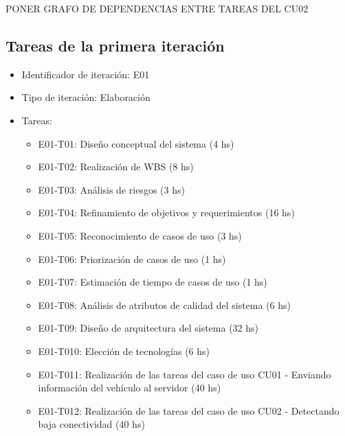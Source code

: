 PONER GRAFO DE DEPENDENCIAS ENTRE TAREAS DEL CU02


\subsection{Tareas de la primera iteración}

\begin{itemize}
\item Identificador de iteración: E01
\item Tipo de iteración: Elaboración
\item Tareas:
\begin{itemize}
\item E01-T01: Diseño conceptual del sistema (4 hs)
\item E01-T02: Realización de WBS (8 hs)
\item E01-T03: Análisis de riesgos (3 hs)
\item E01-T04: Refinamiento de objetivos y requerimientos (16 hs)
\item E01-T05: Reconocimiento de casos de uso (3 hs)
\item E01-T06: Priorización de casos de uso (1 hs)
\item E01-T07: Estimación de tiempo de casos de uso (1 hs)
\item E01-T08: Análisis de atributos de calidad del sistema (6 hs)
\item E01-T09: Diseño de arquitectura del sistema (32 hs)
\item E01-T010: Elección de tecnologías (6 hs)
\item E01-T011: Realización de las tareas del caso de uso CU01 - Enviando información del vehículo al servidor (40 hs)
\item E01-T012: Realización de las tareas del caso de uso CU02 - Detectando baja conectividad (40 hs)
\end{itemize}
\end{itemize}


